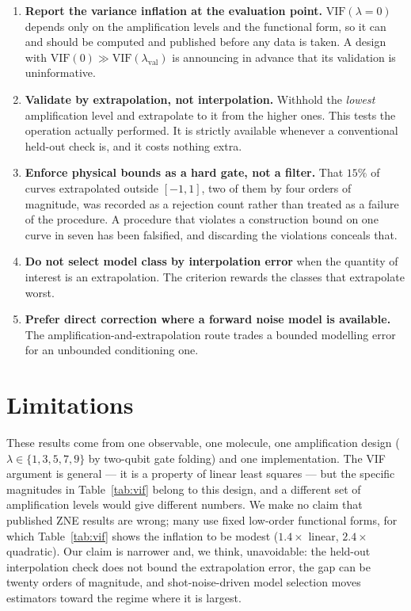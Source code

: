 \documentclass[aps,prx,twocolumn,superscriptaddress,nofootinbib,floatfix]{revtex4-2}
\begin{document}
\begin{enumerate}
\item \textbf{Report the variance inflation at the evaluation point.}
$\mathrm{VIF}(\lambda{=}0)$ depends only on the amplification levels and
the functional form, so it can and should be computed and published
before any data is taken. A design with
$\mathrm{VIF}(0)\gg\mathrm{VIF}(\lambda_{\mathrm{val}})$ is announcing in
advance that its validation is uninformative.

\item \textbf{Validate by extrapolation, not interpolation.} Withhold the
\emph{lowest} amplification level and extrapolate to it from the higher
ones. This tests the operation actually performed. It is strictly
available whenever a conventional held-out check is, and it costs nothing
extra.

\item \textbf{Enforce physical bounds as a hard gate, not a filter.} That
$15\%$ of curves extrapolated outside $[-1,1]$, two of them by four
orders of magnitude, was recorded as a rejection count rather than treated
as a failure of the procedure. A procedure that violates a construction
bound on one curve in seven has been falsified, and discarding the
violations conceals that.

\item \textbf{Do not select model class by interpolation error} when the
quantity of interest is an extrapolation. The criterion rewards the
classes that extrapolate worst.

\item \textbf{Prefer direct correction where a forward noise model is
available.} The amplification-and-extrapolation route trades a bounded
modelling error for an unbounded conditioning one.
\end{enumerate}

\section{Limitations}

These results come from one observable, one molecule, one amplification
design ($\lambda\in\{1,3,5,7,9\}$ by two-qubit gate folding) and one
implementation. The VIF argument is general --- it is a property of linear
least squares --- but the specific magnitudes in Table~\ref{tab:vif}
belong to this design, and a different set of amplification levels would
give different numbers. We make no claim that published ZNE results are
wrong; many use fixed low-order functional forms, for which
Table~\ref{tab:vif} shows the inflation to be modest ($1.4\times$ linear,
$2.4\times$ quadratic). Our claim is narrower and, we think, unavoidable:
the held-out interpolation check does not bound the extrapolation error,
the gap can be twenty orders of magnitude, and shot-noise-driven model
selection moves estimators toward the regime where it is largest.
\end{document}
